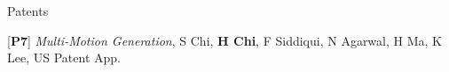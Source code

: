 \begin{cventries}
%
\cvpub
{Patents}{
\begin{cvitems}
\item {[\textbf{P7}] \textit{Multi-Motion Generation}, \newline
        \hspace{1.8em}S Chi, \textbf{H Chi}, F Siddiqui, N Agarwal, H Ma, K Lee, US Patent App.}

\end{cvitems}}
\end{cventries}
